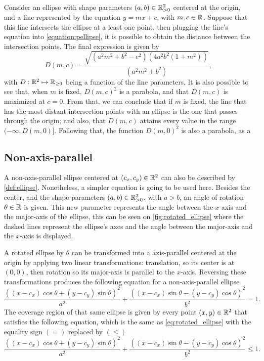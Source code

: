 Consider an ellipse with shape parameters $(a, b)\in\mathbb{R}^2_{>0}$ centered at the origin, and a line represented by the equation $y=mx+c$, with $m, c\in \mathbb{R}$. Suppose that this line intersects the ellipse at a least one point, then plugging the line's equation into \autoref{equation:pellipse}, it is possible to obtain the distance between the intersection points. The final expression is given by
\begin{equation}\label{eq:dist_line_ellipse}
D(m, c)=\dfrac{\sqrt{(a^2m^2+b^2-c^2)(4a^2b^2(1+m^2))}}{(a^2m^2+b^2)},
\end{equation}
with $D : \mathbb{R}^2 \mapsto \mathbb{R}_{\ge0}$ being a function of the line parameters. It is also possible to see that, when $m$ is fixed, $D(m, c)^2$ is a parabola, and that $D(m, c)$ is maximized at $c=0$. From that, we can conclude that if $m$ is fixed, the line that has the most distant intersection points with an ellipse is the one that passes through the origin; and also, that $D(m, c)$ attains every value in the range $(-\infty, D(m, 0)]$. Following that, the function $D(m, 0)^2$ is also a parabola, as a 

\subsection{Non-axis-parallel}

A non-axis-parallel ellipse centered at $(c_x, c_y)\in\mathbb{R}^2$ can also be described by \autoref{def:ellipse}. Nonetheless, a simpler equation is going to be used here. Besides the center, and the shape parameters $(a, b) \in \mathbb{R}^2_{>0}$, with $a > b$, an angle of rotation $\theta \in \mathbb{R}$ is given. This new parameter represents the angle between the $x$-axis and the major-axis of the ellipse, this can be seen on \autoref{fig:rotated_ellipse} where the dashed lines represent the ellipse's axes and the angle between the major-axis and the $x$-axis is displayed.

A rotated ellipse by $\theta$ can be transformed into a axis-parallel centered at the origin by applying two linear transformations: translation, so its center is at $(0, 0)$, then rotation so its major-axis is parallel to the $x$-axis. Reversing these transformations produces the following equation for a non-axis-parallel ellipse
\begin{equation}\label{eq:rotated_ellipse}
\dfrac{((x-c_x)\cos\theta + (y-c_y)\sin\theta)^2}{a^2}+\dfrac{((x-c_x)\sin\theta - (y-c_y)\cos\theta)^2}{b^2}=1.
\end{equation}
The coverage region of that same ellipse is given by every point $(x, y)\in\mathbb{R}^2$ that satisfies the following equation, which is the same as \autoref{eq:rotated_ellipse} with the equality sign $(=)$ replaced by $(\le)$
\begin{equation}\label{eq:rotated_ellipse_co}
\dfrac{((x-c_x)\cos\theta + (y-c_y)\sin\theta)^2}{a^2}+\dfrac{((x-c_x)\sin\theta - (y-c_y)\cos\theta)^2}{b^2}\le 1.
\end{equation}

